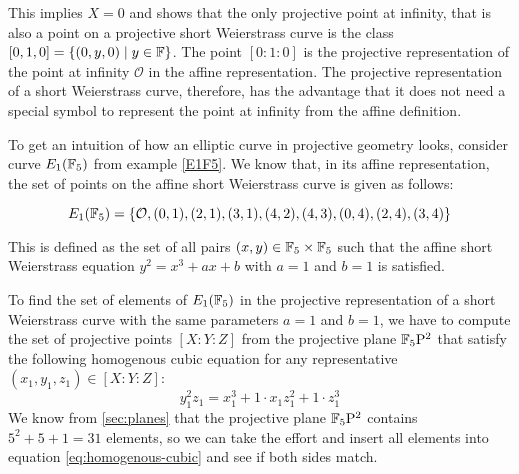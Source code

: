 This implies $X=0$ and shows that the only projective point at infinity, that is also a point on a projective short Weierstrass curve is the class $[0,1,0] = \{(0,y,0)\;|\; y\in \mathbb{F}\}$. The point $[0:1:0]$ is the projective representation of the point at infinity $\mathcal{O}$ in the affine representation. The projective representation of a short Weierstrass curve, therefore, has the advantage that it does not need a special symbol to represent the point at infinity from the affine definition.

\begin{example}
\label{ex:E1F5-projective}
 To get an intuition of how an elliptic curve in projective geometry looks, consider curve $E_1(\mathbb{F}_5)$ from example \ref{E1F5}. We know that, in its affine representation, the set of points on the affine short Weierstrass curve is given as follows:

\begin{equation}\label{eq:E1F5-affine}
E_1(\mathbb{F}_5) = \{\mathcal{O}, (0,1),(2,1),(3,1),(4,2),(4,3),(0,4),(2,4),(3,4)\}
\end{equation}

This is defined as the set of all pairs $(x,y)\in \mathbb{F}_5\times \mathbb{F}_5$ such that the affine short Weierstrass equation $y^2 = x^3 + ax +b$ with $a=1$ and $b=1$ is satisfied.

To find the set of elements of $E_1(\mathbb{F}_5)$ in the projective representation of a short Weierstrass curve with the same parameters $a=1$ and $b=1$, we have to compute the set of projective points $[X:Y:Z]$ from the projective plane $\mathbb{F}_5\mathrm{P}^2$ that satisfy the following homogenous cubic equation for any representative $(x_1,y_1,z_1)\in [X:Y:Z]$:
\begin{equation}\label{eq:homogenous-cubic}
y_1^2z_1 = x_1^3 + 1\cdot x_1 z_1^2 + 1\cdot z_1^3
\end{equation}
We know from \ref{sec:planes} that the projective plane $\mathbb{F}_5\mathrm{P}^2$ contains $5^2+5+1= 31$ elements, so we can take the effort and insert all elements into equation \ref{eq:homogenous-cubic} and see if both sides match.


\end{example}
